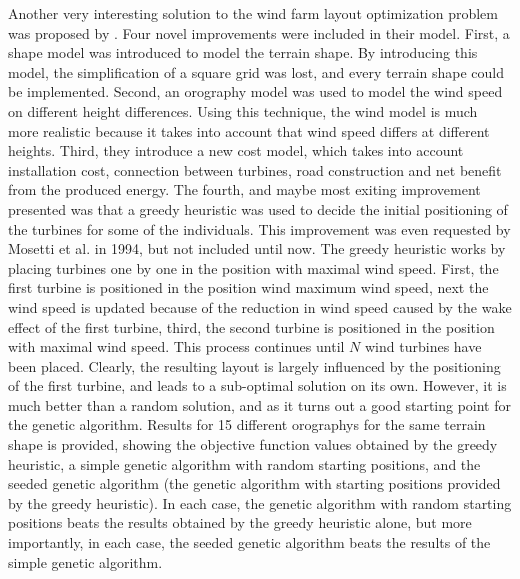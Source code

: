 \noindent Another very interesting solution to the wind farm layout optimization problem was proposed by \citep{Saavedra-Morena}. Four novel improvements were included in their model. First, a shape model was introduced to model the terrain shape. By introducing this model, the simplification of a square grid was lost, and every terrain shape could be implemented. Second, an orography model was used to model the wind speed on different height differences. Using this technique, the wind model is much more realistic because it takes into account that wind speed differs at different heights. Third, they introduce a new cost model, which takes into account installation cost, connection between turbines, road construction and net benefit from the produced energy. The fourth, and maybe most exiting improvement presented  was that a greedy heuristic was used to decide the initial positioning of the turbines for some of the individuals. This improvement was even requested by Mosetti et al. in 1994, but not included until now. The greedy heuristic works by placing turbines one by one in the position with maximal wind speed. First, the first turbine is positioned in the position wind maximum wind speed, next the wind speed is updated because of the reduction in wind speed caused by the wake effect of the first turbine, third, the second turbine is positioned in the position with maximal wind speed. This process continues until $N$ wind turbines have been placed. Clearly, the resulting layout is largely influenced by the positioning of the first turbine, and leads to a sub-optimal solution on its own. However, it is much better than a random solution, and as it turns out a good starting point for the genetic algorithm. Results for 15 different orographys for the same terrain shape is provided, showing the objective function values obtained by the greedy heuristic, a simple genetic algorithm with random starting positions, and the seeded genetic algorithm (the genetic algorithm with starting positions provided by the greedy heuristic). In each case, the genetic algorithm with random starting positions beats the results obtained by the greedy heuristic alone, but more importantly, in each case, the seeded genetic algorithm beats the results of the simple genetic algorithm. \\


